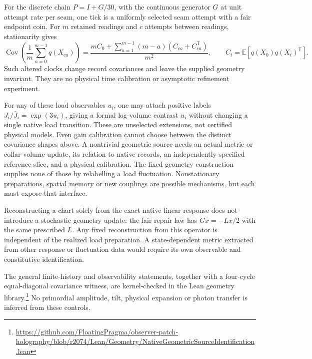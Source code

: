For the discrete chain \(P=I+G/30\), with the continuous
generator \(G\) at unit attempt rate per seam, one tick is a uniformly selected
seam attempt with a fair endpoint coin. For \(m\) retained readings
and \(c\) attempts between readings, stationarity gives
\[
 \operatorname{Cov}\!\left(\frac1m\sum_{a=0}^{m-1}q(X_{ca})\right)
 =\frac{mC_0+\sum_{a=1}^{m-1}(m-a)(C_{ca}+C_{ca}^{\mathsf T})}{m^2},
 \qquad C_t=\mathbb E[q(X_0)q(X_t)^{\mathsf T}].
\]
Such altered clocks change record covariances and leave the supplied
geometry invariant. They are no physical time calibration or asymptotic
refinement experiment.

For any of these load observables \(u_i\), one may attach positive labels
\(J_i/\bar J_i=\exp(3u_i)\), giving a formal log-volume contrast \(u_i\)
without changing a single native load transition. These are unselected
extensions, not certified physical models. Even gain calibration cannot
choose between the distinct covariance shapes above. A nontrivial geometric
source needs an actual metric or collar-volume update, its relation to native
records, an independently specified reference slice, and a physical
calibration. The fixed-geometry construction supplies none of those by
relabelling a load fluctuation. Nonstationary preparations, spatial memory or
new couplings are possible mechanisms, but each must expose that interface.

Reconstructing a chart solely from the exact native linear response does
not introduce a stochastic geometry update: the fair repair law has
\(Gx=-Lx/2\) with the same prescribed \(L\). Any fixed reconstruction
from this operator is independent of the realized load preparation. A
state-dependent metric extracted from other response or fluctuation data
would require its own observable and constitutive identification.

The general finite-history and observability statements, together with a
four-cycle equal-diagonal covariance witness, are kernel-checked in the Lean
geometry library.\footnote{\url{https://github.com/FloatingPragma/observer-patch-holography/blob/r2074/Lean/Geometry/NativeGeometricSourceIdentification.lean}}
No primordial amplitude,
tilt, physical expansion or photon transfer is inferred from these controls.
